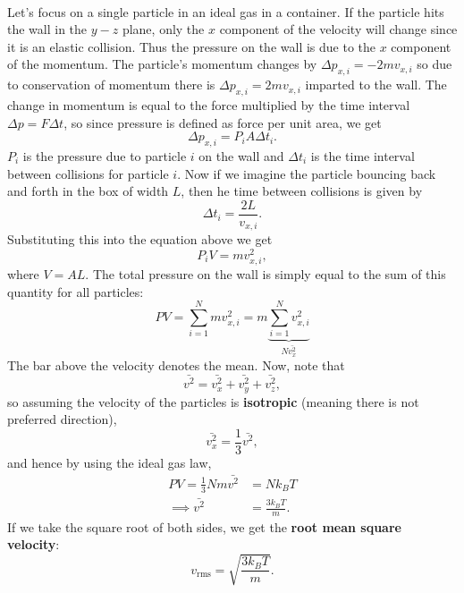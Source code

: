 \documentclass[../thermodynamics.tex]{subfiles}
\begin{document}
        \paragraph{}
        Let's focus on a single particle in an ideal gas in a container.
        If the particle hits the wall in the $y-z$ plane, only the $x$ component of the velocity will change since it is an elastic collision.
        Thus the pressure on the wall is due to the $x$ component of the momentum.
        The particle's momentum changes by $\Delta p_{x,i}=-2mv_{x,i}$ so due to conservation of momentum there is $\Delta p_{x,i}=2mv_{x,i}$ imparted to the wall.
        The change in momentum is equal to the force multiplied by the time interval $\Delta p=F\Delta t$, so since pressure is defined as force per unit area, we get
        \begin{equation}
            \Delta p_{x,i}=P_iA\Delta t_i.
        \end{equation}
        $P_i$ is the pressure due to particle $i$ on the wall and $\Delta t_i$ is the time interval between collisions for particle $i$.
        Now if we imagine the particle bouncing back and forth in the box of width $L$, then he time between collisions is given by
        \begin{equation}
            \Delta t_i=\frac{2L}{v_{x,i}}.
        \end{equation}
        Substituting this into the equation above we get
        \begin{equation}
            P_iV=mv_{x,i}^2,
        \end{equation}
        where $V=AL$.
        The total pressure on the wall is simply equal to the sum of this quantity for all particles:
        \begin{equation}
            PV=\sum_{i=1}^{N}mv_{x,i}^2=m\underbrace{\sum_{i=1}^{N}v_{x,i}^2}_{N\bar{v_x^2}}
        \end{equation}
        The bar above the velocity denotes the mean.
        Now, note that
        \begin{equation}
            \bar{v^2}=\bar{v_x^2}+\bar{v_y^2}+\bar{v_z^2},
        \end{equation}
        so assuming the velocity of the particles is \textbf{isotropic} (meaning there is not preferred direction),
        \begin{equation}
            \bar{v_x^2}=\frac{1}{3}\bar{v^2},
        \end{equation}
        and hence by using the ideal gas law,
        \begin{align}
            PV=\frac{1}{3}Nm\bar{v^2}&=Nk_BT\\
            \implies\bar{v^2}&=\frac{3k_BT}{m}.
        \end{align}
        If we take the square root of both sides, we get the \textbf{root mean square velocity}:
        \begin{equation}
            v_\text{rms}=\sqrt{\frac{3k_BT}{m}}.
        \end{equation}
\end{document}
